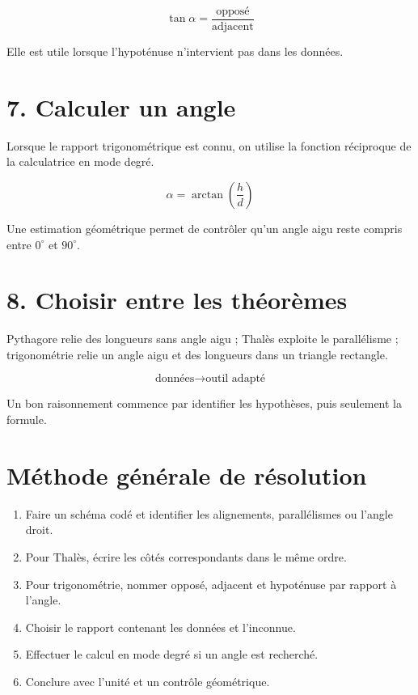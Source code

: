 \[
\tan\alpha=\dfrac{\text{opposé}}{\text{adjacent}}
\]

\begin{exemple}
Elle est utile lorsque l’hypoténuse n’intervient pas dans les données.
\end{exemple}

\section{7. Calculer un angle}
Lorsque le rapport trigonométrique est connu, on utilise la fonction réciproque de la calculatrice en mode degré.

\[
\alpha=\arctan\!\left(\dfrac{h}{d}\right)
\]

\begin{exemple}
Une estimation géométrique permet de contrôler qu’un angle aigu reste compris entre $0^\circ$ et $90^\circ$.
\end{exemple}

\section{8. Choisir entre les théorèmes}
Pythagore relie des longueurs sans angle aigu ; Thalès exploite le parallélisme ; trigonométrie relie un angle aigu et des longueurs dans un triangle rectangle.

\[
\text{données}\rightarrow\text{outil adapté}
\]

\begin{exemple}
Un bon raisonnement commence par identifier les hypothèses, puis seulement la formule.
\end{exemple}

\section{Méthode générale de résolution}
\begin{methode}
\begin{enumerate}
\item Faire un schéma codé et identifier les alignements, parallélismes ou l’angle droit.
\item Pour Thalès, écrire les côtés correspondants dans le même ordre.
\item Pour trigonométrie, nommer opposé, adjacent et hypoténuse par rapport à l’angle.
\item Choisir le rapport contenant les données et l’inconnue.
\item Effectuer le calcul en mode degré si un angle est recherché.
\item Conclure avec l’unité et un contrôle géométrique.
\end{enumerate}
\end{methode}

